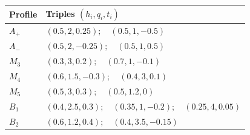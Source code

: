 \begin{tabular}{@{}ll@{}}
\toprule
Profile & Triples $(h_i,q_i,t_i)$ \\
\midrule
$A_+$ & $(0.5,2,0.25);\quad (0.5,1,-0.5)$ \\
$A_-$ & $(0.5,2,-0.25);\quad (0.5,1,0.5)$ \\
$M_3$ & $(0.3,3,0.2);\quad (0.7,1,-0.1)$ \\
$M_4$ & $(0.6,1.5,-0.3);\quad (0.4,3,0.1)$ \\
$M_5$ & $(0.5,3,0.3);\quad (0.5,1.2,0)$ \\
$B_1$ & $(0.4,2.5,0.3);\quad (0.35,1,-0.2);\quad (0.25,4,0.05)$ \\
$B_2$ & $(0.6,1.2,0.4);\quad (0.4,3.5,-0.15)$ \\
\bottomrule
\end{tabular}
